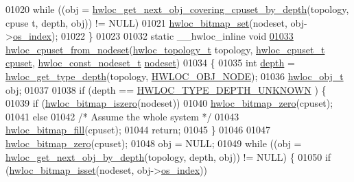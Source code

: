 \begin{DoxyCode}
01020         \textcolor{keywordflow}{while} ((obj = \hyperlink{a00056_ga2f9a4ec15e9cfae8c21501257a51ce5b}{hwloc_get_next_obj_covering_cpuset_by_depth}(topology, cpuse
      t, depth, obj)) != NULL)
01021                 \hyperlink{a00065_ga497556af0cc34f109ae0277999c074d3}{hwloc_bitmap_set}(nodeset, obj->\hyperlink{a00016_a61a7a80a68eaccbaaa28269e678c81a9}{os_index});
01022 \}
01023 
01032 \textcolor{keyword}{static} \_\_hwloc\_inline \textcolor{keywordtype}{void}
\hypertarget{a00031_source_l01033}{}\hyperlink{a00062_gaa677fd588304b5615de4ea78104adfb5}{01033} \hyperlink{a00062_gaa677fd588304b5615de4ea78104adfb5}{hwloc_cpuset_from_nodeset}(\hyperlink{a00039_ga9d1e76ee15a7dee158b786c30b6a6e38}{hwloc_topology_t} topology, \hyperlink{a00040_ga4bbf39b68b6f568fb92739e7c0ea7801}{hwloc_cpuset_t} \hyperlink{a00016_a67925e0f2c47f50408fbdb9bddd0790f}{cpuset}, 
      \hyperlink{a00040_ga2f5276235841ad66a79bedad16a5a10c}{hwloc_const_nodeset_t} \hyperlink{a00016_a08f0d0e16c619a6e653526cbee4ffea3}{nodeset})
01034 \{
01035         \textcolor{keywordtype}{int} \hyperlink{a00016_a9d82690370275d42d652eccdea5d3ee5}{depth} = \hyperlink{a00046_gaea7c64dd59467f5201ba87712710b14d}{hwloc_get_type_depth}(topology, \hyperlink{a00041_ggacd37bb612667dc437d66bfb175a8dc55aaf0964881117bdedf1a5e9332cd120dd}{HWLOC_OBJ_NODE});
01036         \hyperlink{a00016}{hwloc_obj_t} obj;
01037 
01038         \textcolor{keywordflow}{if} (depth == \hyperlink{a00046_ggaf4e663cf42bbe20756b849c6293ef575a0565ab92ab72cb0cec91e23003294aad}{HWLOC_TYPE_DEPTH_UNKNOWN} ) \{
01039                 \textcolor{keywordflow}{if} (\hyperlink{a00065_gaa94fed35d2a598bc4a8657b6955b7bf5}{hwloc_bitmap_iszero}(nodeset))
01040                         \hyperlink{a00065_ga6c540b9fe63b8223b6aba46d56dd63b8}{hwloc_bitmap_zero}(cpuset);
01041                 \textcolor{keywordflow}{else}
01042                         \textcolor{comment}{/* Assume the whole system */}
01043                         \hyperlink{a00065_ga52456f7ef79d68e610cb65e3f7ffafad}{hwloc_bitmap_fill}(cpuset);
01044                 \textcolor{keywordflow}{return};
01045         \}
01046 
01047         \hyperlink{a00065_ga6c540b9fe63b8223b6aba46d56dd63b8}{hwloc_bitmap_zero}(cpuset);
01048         obj = NULL;
01049         \textcolor{keywordflow}{while} ((obj = \hyperlink{a00053_gab7c1dce3f42ece5bfa621e87cf332418}{hwloc_get_next_obj_by_depth}(topology, depth, obj)) != NULL)
       \{
01050                 \textcolor{keywordflow}{if} (\hyperlink{a00065_ga2583f44cbdb5fff2ea40efdcf3975d3f}{hwloc_bitmap_isset}(nodeset, obj->\hyperlink{a00016_a61a7a80a68eaccbaaa28269e678c81a9}{os_index}))

\end{DoxyCode}
